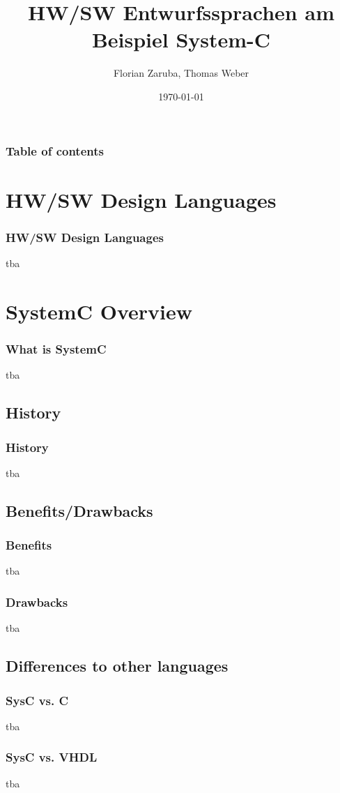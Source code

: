 \documentclass{beamer}
\begin{document}
\title[Entwurssprachen]{HW/SW Entwurfssprachen am Beispiel System-C}
\author[Zaruba F., Weber T.]{Florian Zaruba, Thomas Weber}
\date{\today} 

\begin{frame}
\titlepage
\end{frame}

\begin{frame}\frametitle{Table of contents}
  \tableofcontents
\end{frame}


\section{HW/SW Design Languages} 
\begin{frame}\frametitle{HW/SW Design Languages} 
tba
\end{frame}

\section{SystemC Overview}
\begin{frame}\frametitle{What is SystemC} 
tba
\end{frame}

\subsection{History}
\begin{frame}\frametitle{History} 
tba
\end{frame}

\subsection{Benefits/Drawbacks}
\begin{frame}\frametitle{Benefits} 
tba
\end{frame}
\begin{frame}\frametitle{Drawbacks} 
tba
\end{frame}

\subsection{Differences to other languages}
\begin{frame}\frametitle{SysC vs. C} 
tba
\end{frame}
\begin{frame}\frametitle{SysC vs. VHDL} 
tba
\end{frame}
\end{document}
